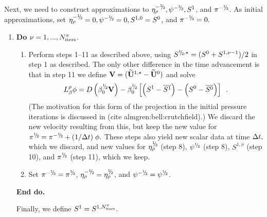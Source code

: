 Next, we need to construct approximations to $\etarho^{-\myhalf}, \psi^{-\myhalf}, S^1$,
and $\pi^{-\myhalf}$.  As initial approximations, set 
$\etarho^{-\myhalf}=0, \psi^{-\myhalf}=0, S^{1,0}=S^0$, and $\pi^{-\myhalf}=0.$
\begin{enumerate}
  \renewcommand{\theenumi}{{\bf \alph{enumi}}}
  \renewcommand{\labelenumii}{\roman{enumii}.}
  \addtocounter{enumi}{1}
  
\item {\bf Do} {$\nu = 1,...,N_{\rm iters}^{\pi}$.}
  
  \begin{enumerate}
  \item Perform steps 1--11 as described above, using 
    $S^{\myhalf,\star} = (S^0 + S^{1,\nu-1})/2$ in step 1 as described.
    The only other difference in the time advancement is that in step 11
    we define ${\bf V} = (\widetilde{{\bf U}}^{1,\star} - \widetilde{{\bf U}}^0)$ and solve
    \begin{equation}  L_\beta^\rho \phi =
      D \left ( \beta_0^{\myhalf} {\bf V} \right) - \beta_0^{\myhalf} \left[ \left(S^{1}-\overline{S^{1}}\right) - \left(S^{0}-\overline{S^{0}}\right) \right] \enskip . 
    \end{equation}
    (The motivation for this form of the projection in the initial pressure iterations
    is discussed in (cite almgren:bell:crutchfield).)
      We discard the new velocity resulting from this, but keep the new  
      value for $\pi^{\myhalf} = \pi^{-\myhalf} + (1 / \dt) \; \phi.$  
      These steps also yield new scalar data at time $\Delta t,$ which
      we discard,  and new values for $\etarho^{\myhalf}$ (step 8), $\psi^{\myhalf}$ (step 8), 
      $S^{1,\nu}$ (step 10), and $\pi^{\myhalf}$ (step 11), which we keep.
    \item Set $\pi^{-\myhalf} = \pi^{\myhalf}$, $\etarho^{-\myhalf} = \etarho^{\myhalf}$,
      and $\psi^{-\myhalf} = \psi^{\myhalf}$. 
    \end{enumerate}
    
    {\bf End do.}
    
    Finally, we define $S^1 = S^{1,N_{\rm iters}^\pi}.$
    
  \end{enumerate}
